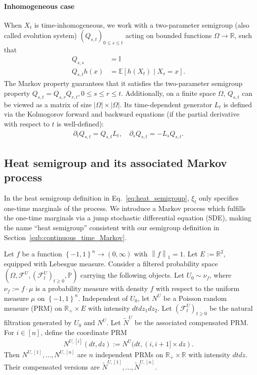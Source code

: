 \documentclass[11pt]{article}
\newcommand{\fU}{U}
\newcommand{\NUi}{N^{U,[i]}}
\newcommand{\sFU}{\mathscr F^U}
\theoremstyle{named}
\theoremstyle{plain}
\newcommand{\defn}{:=}
\newcommand{\real}{\ensuremath{\mathbb{R}}}
\newcommand{\Ind}{\ensuremath{\mathbb{I}}}
\newcommand{\Exs}{\ensuremath{{\mathbb{E}}}}
\newcommand{\Prob}{\ensuremath{{\mathbb{P}}}}
\newcommand{\parenth}[1]{\left( #1 \right)}
\newcommand{\braces}[1]{\left\{ #1 \right \}}
\newcommand{\abss}[1]{\left| #1 \right |}
\newcommand{\vecnorm}[2]{\left\| #1\right\|_{#2}}
\begin{document}
\paragraph{Inhomogeneous case} When $X_t$ is time-inhomogeneous, we work with a two-parameter semigroup (also called evolution system) $(Q_{s, t})_{0 \leq s \leq t}$ acting on bounded functions $\Omega \to \real$, such that
\begin{align*}
  Q_{s, s} &= \Ind \\
  Q_{s, t} h(x) &= \Exs[h(X_t) \mid X_s = x].  
\end{align*}
The Markov property guarantees that it satisfies the two-parameter semigroup property $Q_{s,t} = Q_{s,r}Q_{r,t}, 0 \leq s\leq r \leq t$. Additionally, on a finite space $\Omega$, $Q_{s, t}$ can be viewed as a matrix of size $\abss{\Omega} \times \abss{\Omega}$. 
Its time-dependent generator $L_t$ is defined via the Kolmogorov forward and backward equations (if the partial derivative with respect to $t$ is well-defined): 
\begin{align*}
  \partial_t Q_{s, t} = Q_{s, t} L_t , \quad \partial_s Q_{s, t}  = - L_s Q_{s,t}.
\end{align*}

\subsection{Heat semigroup and its associated Markov process}
In the heat semigroup definition in Eq.~\eqref{eq:heat_semigroup}, $\xi_t$ only specifies one-time marginals of the process. We introduce a Markov process which fulfills the one-time marginals via a jump stochastic differential equation (SDE), making the name ``heat semigroup'' consistent with our semigroup definition in Section~\ref{sub:continuous_time_Markov}. 

Let $f$ be a function $\braces{-1,1}^n \to (0, \infty)$ with $\vecnorm{f}{1} = 1$. Let $E \defn \real^2$, equipped with Lebesgue measure. Consider a filtered probability space $\parenth{\Omega, \sFU, \parenth{\sFU_t}_{t \geq 0}, \Prob}$ carrying the following objects.
Let $\fU_0 \sim \nu_f$, where $\nu_f \defn f \cdot \mu$ is a probability measure with density $f$ with respect to the uniform measure $\mu$ on $\braces{-1, 1}^n$. Independent of $\fU_0$, let $N^U$ be a Poisson random measure (PRM) on $\real_+ \times E$ with intensity $dt dz_1 dz_2$. Let $(\sFU_t)_{t \geq 0}$ be the natural filtration generated by $\fU_0$ and $N^U$. Let $\widetilde{N}^U$ be the associated compensated PRM. For $i \in [n]$, define the coordinate PRM
\begin{align*}
  \NUi(dt, dz) \defn N^U(dt,  (i, i+1] \times dz).
\end{align*}
Then $N^{U, [1]}, \ldots, N^{U, [n]}$ are $n$ independent PRMs on $\real_+ \times \real$ with intensity $dt dz$. Their compensated versions are $\widetilde{N}^{U, [1]}, \ldots, \widetilde{N}^{U, [n]}$.
\end{document}
